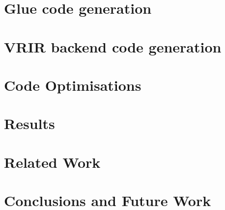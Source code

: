 \documentclass[MSc,twoside,openright]{Thesis}
\begin{document}
\chapter{Glue code generation} \label{chap: glueCode}

\chapter{VRIR backend code generation} \label{chap: vrirBackend}

\chapter{Code Optimisations} \label{chap: codeOptimise}

\chapter{Results} \label{chap: results}

\chapter{Related Work} \label{chap:Related}


\chapter{Conclusions and Future Work} \label{chap:Conclusions}




%

%



\appendix %


%
%
\end{document}

